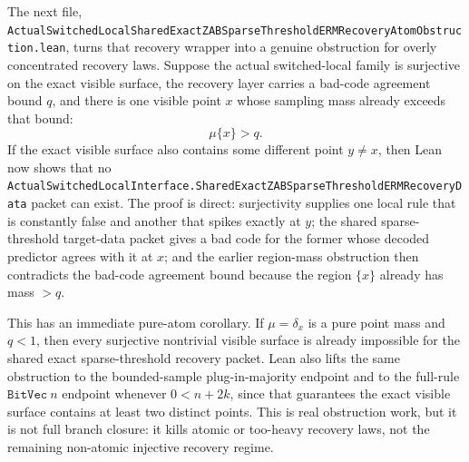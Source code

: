 \documentclass[11pt]{article}
\theoremstyle{remark}
\begin{document}
The next file,
\texttt{ActualSwitchedLocalSharedExactZABSparseThresholdERMRecoveryAtomObstruction.lean},
turns that recovery wrapper into a genuine obstruction for overly concentrated
recovery laws.  Suppose the actual switched-local family is surjective on the
exact visible surface, the recovery layer carries a bad-code agreement bound
\(q\), and there is one visible point \(x\) whose sampling mass already
exceeds that bound:
\[
  \mu\{x\} > q.
\]
If the exact visible surface also contains some different point \(y \ne x\),
then Lean now shows that no
\texttt{ActualSwitchedLocalInterface.SharedExactZABSparseThresholdERMRecoveryData}
packet can exist.  The proof is direct: surjectivity supplies one local rule
that is constantly false and another that spikes exactly at \(y\); the shared
sparse-threshold target-data packet gives a bad code for the former whose
decoded predictor agrees with it at \(x\); and the earlier region-mass
obstruction then contradicts the bad-code agreement bound because the region
\(\{x\}\) already has mass \(> q\).

This has an immediate pure-atom corollary.  If \(\mu = \delta_x\) is a pure
point mass and \(q<1\), then every surjective nontrivial visible surface is
already impossible for the shared exact sparse-threshold recovery packet.
Lean also lifts the same obstruction to the bounded-sample plug-in-majority
endpoint and to the full-rule \(\texttt{BitVec}\ n\) endpoint whenever
\(0 < n + 2k\), since that guarantees the exact visible surface contains at
least two distinct points.  This is real obstruction work, but it is not full
branch closure: it kills atomic or too-heavy recovery laws, not the remaining
non-atomic injective recovery regime.
\end{document}
